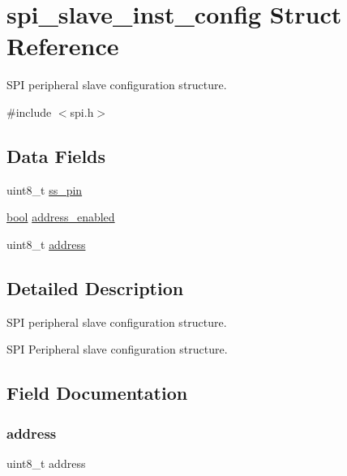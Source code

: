 \hypertarget{structspi__slave__inst__config}{}\section{spi\+\_\+slave\+\_\+inst\+\_\+config Struct Reference}
\label{structspi__slave__inst__config}


S\+PI peripheral slave configuration structure.  




{\ttfamily \#include $<$spi.\+h$>$}

\subsection*{Data Fields}
\begin{DoxyCompactItemize}
\item 
uint8\+\_\+t \mbox{\hyperlink{structspi__slave__inst__config_ae5fb738f754cc7a762c6cc179079b1d8}{ss\+\_\+pin}}
\item 
\mbox{\hyperlink{group__group__sam0__utils_ga97a80ca1602ebf2303258971a2c938e2}{bool}} \mbox{\hyperlink{structspi__slave__inst__config_adae5ab61ddeae146a96386325f8e038b}{address\+\_\+enabled}}
\item 
uint8\+\_\+t \mbox{\hyperlink{structspi__slave__inst__config_af3f726014b044194def151079f1f2d89}{address}}
\end{DoxyCompactItemize}


\subsection{Detailed Description}
S\+PI peripheral slave configuration structure. 

S\+PI Peripheral slave configuration structure. 

\subsection{Field Documentation}
\mbox{\label{structspi__slave__inst__config_af3f726014b044194def151079f1f2d89}} 
\subsubsection{\texorpdfstring{address}{address}}
{\footnotesize\ttfamily uint8\+\_\+t address}

